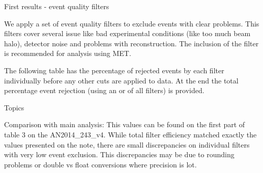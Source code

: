 \documentclass[8pt]{beamer}
\begin{document}
\begin{frame}{First results - event quality filters}

We apply a set of event quality filters to exclude events with clear problems. This filters cover several issue like bad experimental conditions (like too much beam halo), detector noise and problems with reconstruction. The inclusion of the filter is recommended for analysis using MET.

The following table has the percentage of rejected events by each filter individually before any other cuts are applied to data. At the end the total percentage event rejection (using an or of all filters) is provided. 

\begin{block}{Topics}


\end{block}

\begin{block}{Comparison with main analysis:}
 This values can be found on the first part of table 3 on the AN2014\_243\_v4. While total filter efficiency matched exactly the values presented on the note, there are small
 discrepancies on individual filters with very low event exclusion. This discrepancies may be due to rounding problems or double vs float conversions where precision is lot.
\end{block}

\end{frame}
\end{document}
